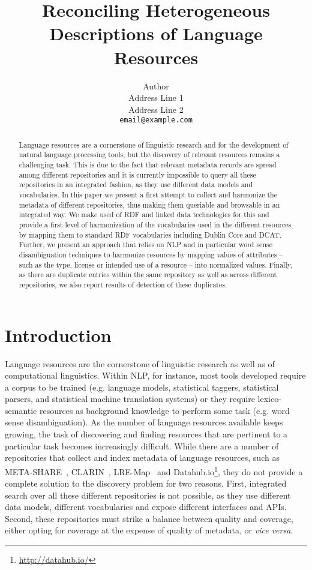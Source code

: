 \documentclass[11pt]{article}
\title{Reconciling Heterogeneous Descriptions of Language Resources}
\author{Author \\
    Address Line 1\\
    Address Line 2\\
{\scriptsize\tt email@example.com}}
\date{}
\begin{document}
\maketitle
\begin{abstract}
	Language resources are a cornerstone of linguistic research and for the development of natural language processing tools, 
	but the discovery of relevant resources remains a challenging task.
        This is due to the fact that relevant metadata records are spread among
        different repositories and it is currently impossible to query all these
        repositories in an integrated fashion, as they use different data
        models and vocabularies. In this paper we present a first attempt to
        collect and harmonize the metadata of different repositories, thus
        making them queriable and browsable in an integrated way. We make used
        of RDF and linked data technologies for this and provide a first level
        of harmonization of the vocabularies used in the different resources by
        mapping them to standard RDF vocabularies including Dublin Core and
        DCAT. Further, we present an approach that relies on NLP and in
        particular word sense disambiguation techniques to harmonize resources
        by mapping values of attributes -- such as the type, license or intended
        use of a resource -- into normalized values. Finally, as there are
        duplicate entries within the same repository as well as across different
        repositories, we also report results of detection of these duplicates.
\end{abstract}

\section{Introduction}

Language resources are the cornerstone of linguistic research as well as of
computational linguistics. Within NLP, for instance, most tools developed
require a corpus to be trained (e.g. language models, statistical taggers, statistical parsers, and statistical machine translation systems) or they require lexico-semantic resources as background knowledge to perform some task (e.g. word sense disambiguation). 
As the number of language resources available keeps growing, the task of discovering and finding resources that are pertinent to a particular task becomes increasingly difficult. While there are a number of repositories that collect and index metadata of language resources, such as META-SHARE~\cite{federmann2012meta},
CLARIN~\cite{broeder2010data}, LRE-Map~\cite{calzolari2012lre} and
Datahub.io\footnote{\url{http://datahub.io/}}, they do not provide a complete solution to the discovery problem for two reasons. First, integrated search over all these different repositories is not possible, as they use different data models, different vocabularies and expose different interfaces and APIs. 
Second, these repositories must strike a balance between quality and coverage,
either opting for coverage at the expense of quality of metadata, or \emph{vice
versa}.
\end{document}
